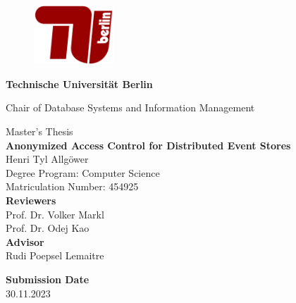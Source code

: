 \thispagestyle{empty}
\begin{center}

\begin{figure}[t]
    \centering
    \includegraphics[width=3cm]{./img/TU-Berlin-Logo.pdf}%
\end{figure}

{\LARGE \textbf{Technische Universit\"at Berlin}}

\vspace{0.5cm}

{\large Chair of Database Systems and Information Management\\[1.6mm]}


\vspace{2.0cm}

{\LARGE Master's Thesis}\\

\vspace{2.45cm}
{\LARGE \textbf{Anonymized Access Control for Distributed Event Stores}}\\
\vspace{1.0cm}
Henri Tyl Allgöwer \\
Degree Program: Computer Science\\
Matriculation Number: 454925\\

\vspace*{2.45cm}
\textbf{Reviewers}\\
Prof. Dr. Volker Markl\\
Prof. Dr. Odej Kao\\
\vspace*{0.5cm}
\textbf{Advisor}\\
Rudi Poepsel Lemaitre\\
\vspace{0.5 cm}

\textbf{Submission Date}\\
30.11.2023\\ %
\end{center}

